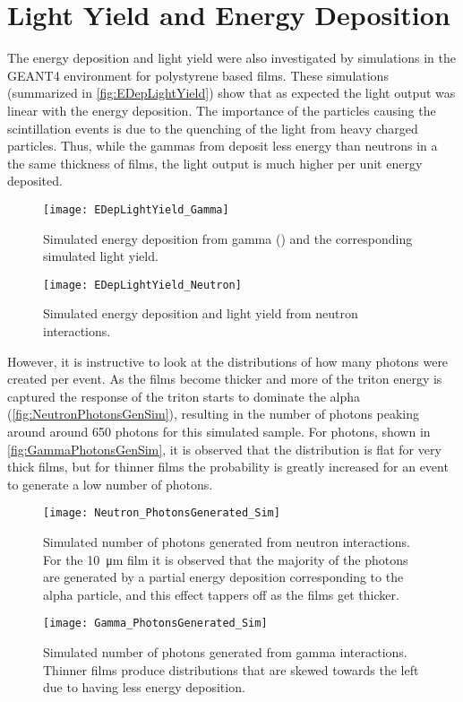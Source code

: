 \section{Light Yield and Energy Deposition}
The energy deposition and light yield were also investigated by simulations in the GEANT4 environment for polystyrene based films.
These simulations (summarized in \autoref{fig:EDepLightYield}) show that as expected the light output was linear with the energy deposition.
The importance of the particles causing the scintillation events is due to the quenching of the light from heavy charged particles.
Thus, while the gammas from  deposit  less energy than neutrons in a the same thickness of films, the light output is much higher per unit energy deposited.
\begin{figure}
 	\centering
  	\texttt{[image: EDepLightYield\_Gamma]}
		\caption[Energy Deposition and Light Yield in Polystyrene from Co-60 Photons]{Simulated energy deposition from gamma () and the corresponding simulated light yield. \SimEDeLYGeo}
\end{figure}
\begin{figure}
 	\centering
  	\texttt{[image: EDepLightYield\_Neutron]}
  	\caption[Energy Deposition and Light Yield in Polystyrene from Neutrons]{Simulated energy deposition and light yield from neutron interactions.  \SimEDeLYGeo}
  \label{fig:EDepLightYield}
\end{figure}
However, it is instructive to look at the distributions of how many photons were created per event.
As the films become thicker and more of the triton energy is captured the response of the triton starts to dominate the alpha (\autoref{fig:NeutronPhotonsGenSim}), resulting in the number of photons peaking around around 650 photons for this simulated sample.
For photons, shown in \autoref{fig:GammaPhotonsGenSim}, it is observed that the distribution is flat for very thick films, but for thinner films the probability is greatly increased for an event to generate a low number of photons.
\begin{figure}
  \centering
  \texttt{[image: Neutron\_PhotonsGenerated\_Sim]}
  \caption[Number of photons generated from neutron interactions]{Simulated number of photons generated from neutron interactions.  For the \SI{10}{\um} film it is observed that the majority of the photons are generated by a partial energy deposition corresponding to the alpha particle, and this effect tappers off as the films get thicker. \SimEDeLYGeo}
  \label{fig:NeutronPhotonsGenSim}
\end{figure}
\begin{figure}
  \centering
  \texttt{[image: Gamma\_PhotonsGenerated\_Sim]}
  \caption[Number of photons generated from gamma interactions]{Simulated number of photons generated from gamma interactions. Thinner films produce distributions that are skewed towards the left due to having less energy deposition. \SimEDeLYGeo}
  \label{fig:GammaPhotonsGenSim}
\end{figure}

